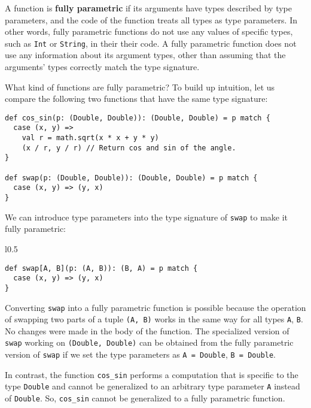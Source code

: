 A function is \textbf{fully parametric}
if its arguments have types described by type parameters, and the
code of the function treats all types as type parameters. In other
words, fully parametric functions do not use any values of specific
types, such as \lstinline!Int! or \lstinline!String!, in their their
code. A fully parametric function does not use any information about
its argument types, other than assuming that the arguments' types
correctly match the type signature.

What kind of functions are fully parametric? To build up intuition,
let us compare the following two functions that have the same type
signature:
\begin{lstlisting}
def cos_sin(p: (Double, Double)): (Double, Double) = p match {
  case (x, y) =>
    val r = math.sqrt(x * x + y * y)
    (x / r, y / r) // Return cos and sin of the angle.
}

def swap(p: (Double, Double)): (Double, Double) = p match {
  case (x, y) => (y, x)
}
\end{lstlisting}
We can introduce type parameters into the type signature of \lstinline!swap!
to make it fully parametric:

\begin{wrapfigure}{l}{0.5\columnwidth}%
\vspace{-0.55\baselineskip}
\begin{lstlisting}
def swap[A, B](p: (A, B)): (B, A) = p match {
  case (x, y) => (y, x)
}
\end{lstlisting}
\vspace{-0.95\baselineskip}
\end{wrapfigure}%

\noindent Converting \lstinline!swap! into a fully parametric function
is possible because the operation of swapping two parts of a tuple
\lstinline!(A, B)! works in the same way for all types \lstinline!A!,
\lstinline!B!. No changes were made in the body of the function.
The specialized version of \lstinline!swap! working on \lstinline!(Double, Double)!
can be obtained from the fully parametric version of \lstinline!swap!
if we set the type parameters as \lstinline!A = Double!, \lstinline!B = Double!.

In contrast, the function \lstinline!cos_sin! performs a computation
that is specific to the type \lstinline!Double! and cannot be generalized
to an arbitrary type parameter \lstinline!A! instead of \lstinline!Double!.
So, \lstinline!cos_sin! cannot be generalized to a fully parametric
function.

